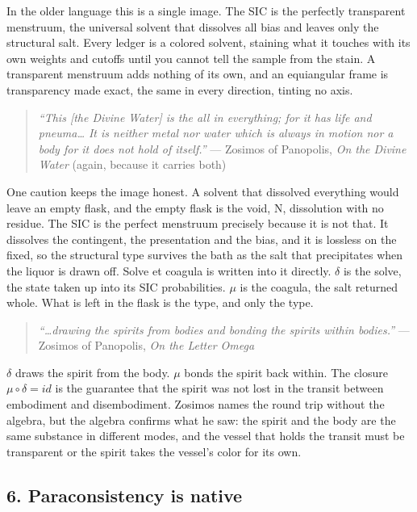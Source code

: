 \documentclass[12pt,a4paper]{article}
\begin{document}
In the older language this is a single image. The SIC is the perfectly
transparent menstruum, the universal solvent that dissolves all bias and
leaves only the structural salt. Every ledger is a colored solvent,
staining what it touches with its own weights and cutoffs until you
cannot tell the sample from the stain. A transparent menstruum adds
nothing of its own, and an equiangular frame is transparency made exact,
the same in every direction, tinting no axis.

\begin{quote}
\emph{``This {[}the Divine Water{]} is the all in everything; for it has
life and pneuma\ldots{} It is neither metal nor water which is always in
motion nor a body for it does not hold of itself.''} --- Zosimos of
Panopolis, \emph{On the Divine Water} (again, because it carries both)
\end{quote}

One caution keeps the image honest. A solvent that dissolved everything
would leave an empty flask, and the empty flask is the void, N,
dissolution with no residue. The SIC is the perfect menstruum precisely
because it is not that. It dissolves the contingent, the presentation
and the bias, and it is lossless on the fixed, so the structural type
survives the bath as the salt that precipitates when the liquor is drawn
off. Solve et coagula is written into it directly. \({δ}\) is the solve,
the state taken up into its SIC probabilities. \({μ}\) is the coagula,
the salt returned whole. What is left in the flask is the type, and only
the type.

\begin{quote}
\emph{``\ldots drawing the spirits from bodies and bonding the spirits
within bodies.''} --- Zosimos of Panopolis, \emph{On the Letter Omega}
\end{quote}

\({δ}\) draws the spirit from the body. \({μ}\) bonds the spirit back
within. The closure \({μ∘δ = id}\) is the guarantee that the spirit was
not lost in the transit between embodiment and disembodiment. Zosimos
names the round trip without the algebra, but the algebra confirms what
he saw: the spirit and the body are the same substance in different
modes, and the vessel that holds the transit must be transparent or the
spirit takes the vessel's color for its own.

\hypertarget{paraconsistency-is-native}{%
\subsection{6. Paraconsistency is
native}\label{paraconsistency-is-native}}
\end{document}
